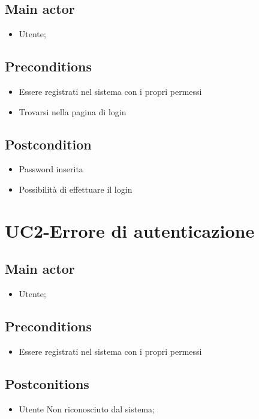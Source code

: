 \documentclass{article}
\begin{document}
     \subsection*{Main actor}
         \begin{itemize}
             \item Utente;
         \end{itemize}
     \subsection*{Preconditions} 
        \begin{itemize}
            \item Essere registrati nel sistema con i propri permessi
            \item Trovarsi nella pagina di login
        \end{itemize}
        \subsection*{Postcondition} 
        \begin{itemize}
            \item Password inserita
            \item Possibilità di effettuare il login
        \end{itemize}

\section{UC2-Errore di autenticazione}
    
     \subsection*{Main actor}
         \begin{itemize}
             \item Utente;
         \end{itemize}
     \subsection*{Preconditions} 
        \begin{itemize}
            \item Essere registrati nel sistema con i propri permessi
        \end{itemize}
               
    \subsection*{Postconitions}
        \begin{itemize}
            \item Utente Non riconosciuto dal sistema;
        \end{itemize}
            
\end{document}
